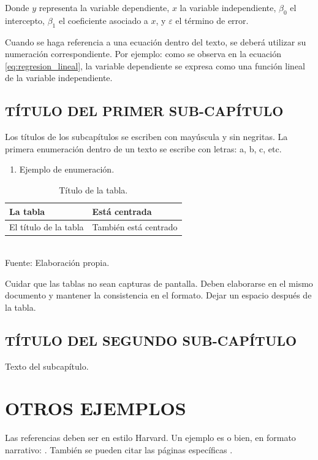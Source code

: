 \documentclass[12pt,oneside]{report}
\begin{document}
Donde \(y\) representa la variable dependiente, \(x\) la variable independiente, \(\beta_0\) el intercepto, \(\beta_1\) el coeficiente asociado a \(x\), y \(\varepsilon\) el término de error.

Cuando se haga referencia a una ecuación dentro del texto, se deberá utilizar su numeración correspondiente. Por ejemplo: como se observa en la ecuación \eqref{eq:regresion_lineal}, la variable dependiente se expresa como una función lineal de la variable independiente.

\section{TÍTULO DEL PRIMER SUB-CAPÍTULO}
Los títulos de los subcapítulos se escriben con mayúscula y sin negritas.
La primera enumeración dentro de un texto se escribe con letras: a, b, c, etc.

\begin{enumerate}[label=\alph*)]
  \item Ejemplo de enumeración.
\end{enumerate}

\begin{table}[H]
  \centering
  \caption{Título de la tabla.}
  \begin{tabular}{|p{}|p{}|}
    \hline
    La tabla & Está centrada \\ \hline
    El título de la tabla & También está centrado \\ \hline
  \end{tabular}\\[3pt]
  {\footnotesize Fuente: Elaboración propia.}
\end{table}

Cuidar que las tablas no sean capturas de pantalla. Deben elaborarse en el mismo documento y
mantener la consistencia en el formato.
Dejar un espacio después de la tabla.

\section{TÍTULO DEL SEGUNDO SUB-CAPÍTULO}
Texto del subcapítulo.

\chapter{OTROS EJEMPLOS}
Las referencias deben ser en estilo Harvard. Un ejemplo es \parencite{Perez2022Articulo} o bien, en formato narrativo: \textcite{Perez2022Articulo}.
También se pueden citar las páginas específicas \parencite[pp. 25--27]{Perez2022Articulo}.
\end{document}
